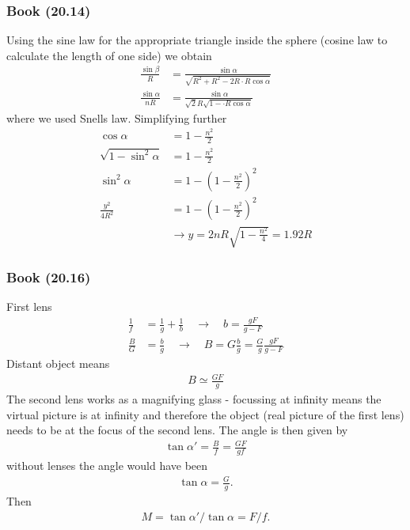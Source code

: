 \documentclass[10pt,a4paper]{article}
\theoremstyle{definition}
\begin{document}
\subsubsection{Book (20.14)}
Using the sine law for the appropriate triangle inside the sphere (cosine law to calculate the length of one side) we obtain
\begin{align}
\frac{\sin\beta}{R}&=\frac{\sin\alpha}{\sqrt{R^2+R^2-2R\cdot R\cos\alpha}}\\
\frac{\sin\alpha}{nR}&=\frac{\sin\alpha}{\sqrt{2}R\sqrt{1-\cdot R\cos\alpha}}
\end{align}
where we used Snells law. Simplifying further
\begin{align}
\cos\alpha&=1-\frac{n^2}{2}\\
\sqrt{1-\sin^2\alpha}&=1-\frac{n^2}{2}\\
\sin^2\alpha&=1-\left(1-\frac{n^2}{2}\right)^2\\
\frac{y^2}{4R^2}&=1-\left(1-\frac{n^2}{2}\right)^2\\
&\rightarrow y=2nR\sqrt{1-\frac{n^2}{4}}=1.92R
\end{align}

\subsubsection{Book (20.16)}
First lens
\begin{align}
\frac{1}{f}&=\frac{1}{g}+\frac{1}{b}\quad\rightarrow\quad b=\frac{gF}{g-F}\\
\frac{B}{G}&=\frac{b}{g}\quad\rightarrow\quad B=G\frac{b}{g}=\frac{G}{g}\frac{gF}{g-F}
\end{align}
Distant object means
\begin{align}
B\simeq\frac{GF}{g}
\end{align}
The second lens works as a magnifying glass - focussing at infinity means the virtual picture is at infinity and therefore the object (real picture of the first lens) needs to be at the focus of the second lens.
The angle is then given by
\begin{align}
\tan\alpha'=\frac{B}{f}=\frac{GF}{gf}
\end{align}
without lenses the angle would have been
\begin{align}
\tan\alpha=\frac{G}{g}.
\end{align}
Then
\begin{align}
M=\tan\alpha'/\tan\alpha=F/f.
\end{align}
\end{document}
